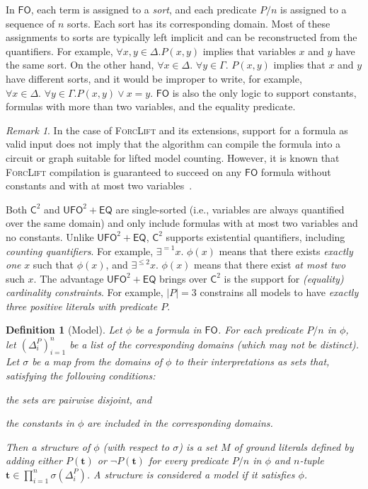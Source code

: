 \documentclass{article}
\newtheorem{definition}{Definition}
\theoremstyle{remark}
\newtheorem*{remark}{Remark}
\newcommand{\Ctwo}{$\mathsf{C}^{2}$}
\newcommand{\FO}{$\mathsf{FO}$}
\newcommand{\UFO}{$\mathsf{UFO}^{2} + \mathsf{EQ}$}
\begin{document}
In \FO{}, each term is assigned to a \emph{sort}, and each predicate $P/n$ is
assigned to a sequence of $n$ sorts. Each sort has its corresponding domain.
Most of these assignments to sorts are typically left implicit and can be
reconstructed from the quantifiers. For example, $\forall x,y \in \Delta\text{.
}P(x, y)$ implies that variables $x$ and $y$ have the same sort. On the other
hand, $\forall x \in \Delta\text{. }\forall y \in \Gamma\text{. } P(x, y)$
implies that $x$ and $y$ have different sorts, and it would be improper to
write, for example, $\forall x \in \Delta\text{. }\forall y \in \Gamma\text{.
} P(x, y) \lor x = y$. \FO{} is also the only logic to support constants,
formulas with more than two variables, and the equality predicate.

\begin{remark}
  In the case of \textsc{ForcLift} and its extensions, support for a formula as
  valid input does not imply that the algorithm can compile the formula into a
  circuit or graph suitable for lifted model counting. However, it is known that
  \textsc{ForcLift} compilation is guaranteed to succeed on any \FO{} formula
  without constants and with at most two
  variables~\cite{DBLP:conf/nips/Broeck11,DBLP:conf/kr/BroeckMD14}.
\end{remark}

Both \Ctwo{} and \UFO{} are single-sorted (i.e., variables are always quantified
over the same domain) and only include formulas with at most two variables and
no constants. Unlike \UFO{}, \Ctwo{} supports existential quantifiers, including
\emph{counting quantifiers}. For example, $\exists^{=1} x\text{. }\phi(x)$ means
that there exists \emph{exactly one} $x$ such that $\phi(x)$, and
$\exists^{\le 2} x\text{. }\phi(x)$ means that there exist \emph{at most two}
such $x$. The advantage \UFO{} brings over \Ctwo{} is the support for
\emph{(equality) cardinality constraints}. For example, $|P| = 3$ constrains all
models to have \emph{exactly three positive literals with predicate $P$}.

\begin{definition}[Model]\label{def:model}
  Let $\phi$ be a formula in \FO{}. For each predicate $P/n$ in $\phi$, let
  ${(\Delta_{i}^{P})}_{i=1}^{n}$ be a list of the corresponding domains (which
  may not be distinct). Let $\sigma$ be a map from the domains of $\phi$ to
  their interpretations as sets that, satisfying the following conditions:
  \begin{enumerate*}[label=(\roman*)]
    \item the sets are pairwise disjoint, and
    \item the constants in $\phi$ are included in the corresponding domains.
  \end{enumerate*}
  Then a \emph{structure} of $\phi$ (with respect to $\sigma$) is a set $M$ of
  ground literals defined by adding either $P(\mathbf{t})$ or
  $\neg P(\mathbf{t})$ for every predicate $P/n$ in $\phi$ and $n$-tuple
  $\mathbf{t} \in \prod_{i=1}^{n} \sigma(\Delta_{i}^{P})$. A structure is
  considered a \emph{model} if it satisfies $\phi$.
\end{definition}
\end{document}

